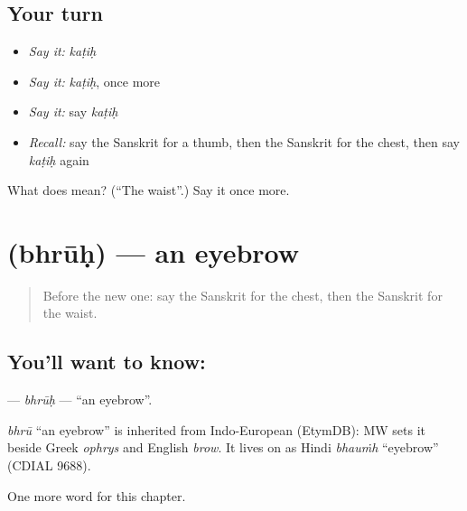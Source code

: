 \subsection*{Your turn}
\begin{itemize}
\raggedright
  \item \emph{Say it:} \emph{kaṭiḥ}
  \item \emph{Say it:} \emph{kaṭiḥ}, once more
  \item \emph{Say it:} say \emph{kaṭiḥ}
  \item \emph{Recall:} say the Sanskrit for a thumb, then the Sanskrit for the chest, then say \emph{kaṭiḥ} again
\end{itemize}

\begin{tcolorbox}[breakable,colback=teal!4,colframe=teal!35!black,title={Before you move on}]
What does  mean? (\textquotedblleft{}The waist\textquotedblright{}.) Say it once more.
\end{tcolorbox}
\section[\texorpdfstring{\sk{भ्रूः} (bhrūḥ)}{भ्रूः (bhrūḥ)}]{ (bhrūḥ) — an eyebrow}

\label{lesson:SA-C117-bhruh}



\begin{quote}
Before the new one: say the Sanskrit for the chest, then the Sanskrit for the waist.
\end{quote}

\subsection*{You'll want to know: }
\textbf{} — \emph{bhrūḥ} — \textquotedblleft{}an eyebrow\textquotedblright{}.

\begin{cousinweb}
\emph{bhrū} \textquotedblleft{}an eyebrow\textquotedblright{} is inherited from Indo-European (EtymDB): MW sets it beside Greek \emph{ophrys} and English \emph{brow}. It lives on as Hindi \emph{bhauṁh} \textquotedblleft{}eyebrow\textquotedblright{} (CDIAL 9688).
\end{cousinweb}

\begin{grammarlens}[title={What you've built}]
One more word for this chapter.
\end{grammarlens}

